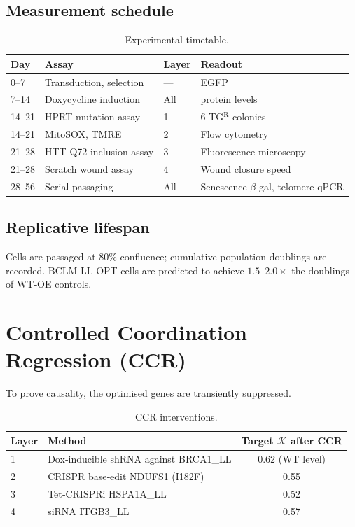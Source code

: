 \documentclass[12pt,a4paper]{article}
\newcommand{\REL}{\mathcal{K}}          %
\begin{document}
	\subsection{Measurement schedule}
	\begin{table}[H]
		\centering
		\caption{Experimental timetable.}
		\label{tab:schedule}
		\begin{tabular}{@{}llll@{}}
			\toprule
			\textbf{Day} & \textbf{Assay} & \textbf{Layer} & \textbf{Readout} \\
			\midrule
			0–7   & Transduction, selection & --- & EGFP \\
			7–14  & Doxycycline induction & All & protein levels \\
			14–21 & HPRT mutation assay & 1 & 6‑TG\(^{\mathrm{R}}\) colonies \\
			14–21 & MitoSOX, TMRE & 2 & Flow cytometry \\
			21–28 & HTT‑Q72 inclusion assay & 3 & Fluorescence microscopy \\
			21–28 & Scratch wound assay & 4 & Wound closure speed \\
			28–56 & Serial passaging & All & Senescence \(\beta\)-gal, telomere qPCR \\
			\bottomrule
		\end{tabular}
	\end{table}
	
	\subsection{Replicative lifespan}
	Cells are passaged at 80\% confluence; cumulative population doublings are recorded. BCLM‑LL‑OPT cells are predicted to achieve \(1.5\)–\(2.0\times\) the doublings of WT‑OE controls.
	
	\section{Controlled Coordination Regression (CCR)}
	\label{sec:CCR}
	To prove causality, the optimised genes are transiently suppressed.
	
	\begin{table}[H]
		\centering
		\caption{CCR interventions.}
		\label{tab:CCR}
		\begin{tabular}{@{}llc@{}}
			\toprule
			\textbf{Layer} & \textbf{Method} & \textbf{Target \(\REL\) after CCR} \\
			\midrule
			1 & Dox‑inducible shRNA against BRCA1\_LL & 0.62 (WT level) \\
			2 & CRISPR base‑edit NDUFS1 (I182F)       & 0.55 \\
			3 & Tet‑CRISPRi HSPA1A\_LL               & 0.52 \\
			4 & siRNA ITGB3\_LL                      & 0.57 \\
			\bottomrule
		\end{tabular}
	\end{table}
	
\end{document}
